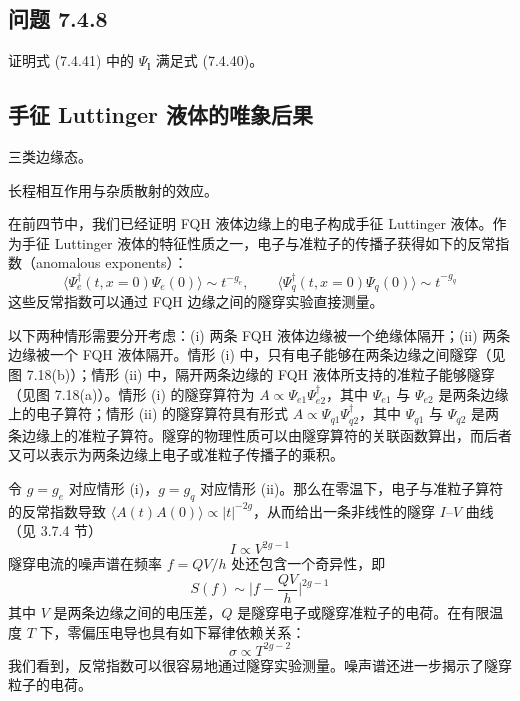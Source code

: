 \subsection*{问题 7.4.8}
证明式 (7.4.41) 中的 $\Psi_{\pmb{l}}$ 满足式 (7.4.40)。

\subsection{手征 Luttinger 液体的唯象后果}

\begin{keypoints}
\item 三类边缘态。
\item 长程相互作用与杂质散射的效应。
\end{keypoints}

在前四节中，我们已经证明 FQH 液体边缘上的电子构成手征 Luttinger 液体。作为手征 Luttinger 液体的特征性质之一，电子与准粒子的传播子获得如下的反常指数（anomalous exponents）：
\begin{equation*}
\langle\Psi_{e}^{\dagger}(t,x=0)\Psi_{e}(0)\rangle\sim t^{-g_{e}},\qquad
\langle\Psi_{q}^{\dagger}(t,x=0)\Psi_{q}(0)\rangle\sim t^{-g_{q}}
\end{equation*}
这些反常指数可以通过 FQH 边缘之间的隧穿实验直接测量。


以下两种情形需要分开考虑：(i) 两条 FQH 液体边缘被一个绝缘体隔开；(ii) 两条边缘被一个 FQH 液体隔开。情形 (i) 中，只有电子能够在两条边缘之间隧穿（见图 7.18(b)）；情形 (ii) 中，隔开两条边缘的 FQH 液体所支持的准粒子能够隧穿（见图 7.18(a)）。情形 (i) 的隧穿算符为 $A\propto\Psi_{e1}\Psi_{e2}^{\dagger}$，其中 $\Psi_{e1}$ 与 $\Psi_{e2}$ 是两条边缘上的电子算符；情形 (ii) 的隧穿算符具有形式 $A\propto\Psi_{q1}\Psi_{q2}^{\dagger}$，其中 $\Psi_{q1}$ 与 $\Psi_{q2}$ 是两条边缘上的准粒子算符。隧穿的物理性质可以由隧穿算符的关联函数算出，而后者又可以表示为两条边缘上电子或准粒子传播子的乘积。

令 $g=g_{e}$ 对应情形 (i)，$g=g_{q}$ 对应情形 (ii)。那么在零温下，电子与准粒子算符的反常指数导致 $\langle A(t)A(0)\rangle\propto|t|^{-2g}$，从而给出一条非线性的隧穿 $I$--$V$ 曲线（见 3.7.4 节）
\begin{equation*}
I\propto V^{2g-1}
\end{equation*}
隧穿电流的噪声谱在频率 $f=QV/h$ 处还包含一个奇异性，即
\begin{equation*}
S(f)\sim\bigl|f-\frac{QV}{h}\bigr|^{2g-1} \tag{7.4.49}
\end{equation*}
其中 $V$ 是两条边缘之间的电压差，$Q$ 是隧穿电子或隧穿准粒子的电荷。在有限温度 $T$ 下，零偏压电导也具有如下幂律依赖关系：
\begin{equation*}
\sigma\propto T^{2g-2}
\end{equation*}
我们看到，反常指数可以很容易地通过隧穿实验测量。噪声谱还进一步揭示了隧穿粒子的电荷。

